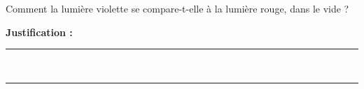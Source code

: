 Comment la lumière violette se compare-t-elle à la lumière rouge, dans le vide ?

\choices

\noindent\textbf{Justification :} \hrulefill \\[2.5ex]
\rule{\linewidth}{0.4pt} \\[2.5ex]
\rule{\linewidth}{0.4pt}
\vfill
